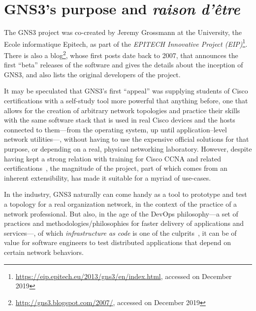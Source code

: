 \section{GNS3's purpose and \emph{raison d'être}}
\label{sec:gns3why}

The GNS3 project was co-created by Jeremy Grossmann at the University, the Ecole informatique Epitech, as part of the \emph{EPITECH Innovative Project (EIP)}\footnote{\url{https://eip.epitech.eu/2013/gns3/en/index.html}, accessed on December 2019}.
There is also a blog\footnote{\url{http://gns3.blogspot.com/2007/}, accessed on December 2019}, whose first posts date back to 2007, that announces the first ``beta'' releases of the software and gives the details about the inception of GNS3, and also lists the original developers of the project.

It may be speculated that GNS3's first ``appeal'' was supplying students of Cisco certifications with a self-study tool more powerful that anything before, one that allows for the creation of arbitrary network topologies and practice their skills with the same software stack that is used in real Cisco devices and the hosts connected to them---from the operating system, up until application--level network utilities---, without having to use the expensive official solutions for that purpose, or depending on a real, physical networking laboratory.
However, despite having kept a strong relation with training for Cisco CCNA and related certifications~\cite{thebookofgns3,gns3netsimguide}, the magnitude of the project, part of which comes from an inherent extensibility, has made it suitable for a myriad of use-cases.

In the industry, GNS3 naturally can come handy as a tool to prototype and test a topology for a real organization network, in the context of the practice of a network professional.
But also, in the age of the DevOps philosophy---a set of practices and methodologies/philosophies for faster delivery of applications and services---, of which \emph{infrastructure as code} is one of the culprits~\cite{awswhatisdevops}, it can be of value for software engineers to test distributed applications that depend on certain network behaviors.


